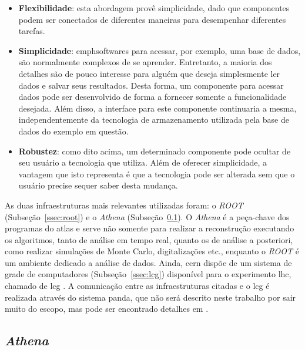 \begin{itemize}
\item \textbf{Flexibilidade}: esta abordagem provê simplicidade, dado que componentes podem
ser conectados de diferentes maneiras para desempenhar diferentes tarefas.
\item \textbf{Simplicidade}: emph{softwares} para acessar, por exemplo, uma base de dados, são
normalmente complexos de se aprender. Entretanto, a maioria dos detalhes são de
pouco interesse para alguém que deseja simplesmente ler dados e salvar seus
resultados. Desta forma, um componente para acessar dados pode ser desenvolvido
de forma a fornecer somente a funcionalidade desejada. Além disso, a interface
para este componente continuaria a mesma, independentemente da tecnologia de
armazenamento utilizada pela base de dados do exemplo em questão.
\item \textbf{Robustez}: como dito acima, um determinado componente pode ocultar de seu
usuário a tecnologia que utiliza. Além de oferecer simplicidade, a vantagem que
isto representa é que a tecnologia pode ser alterada sem que o usuário precise
sequer saber desta mudança.
\end{itemize}



As duas infraestruturas mais relevantes utilizadas foram: o \emph{ROOT}
(Subseção~\ref{ssec:root}) e o \emph{Athena} (Subseção~\ref{ssec:athena}). 
O \emph{Athena} é a peça-chave dos programas do \gls{atlas} e serve não somente
para realizar a reconstrução executando os algoritmos, tanto de análise em tempo
real, quanto os de análise a posteriori, como realizar simulações de Monte Carlo, digitalizações etc., 
enquanto o \emph{ROOT} é um ambiente dedicado a análise de dados. 
Ainda, \gls{cern} dispõe de um sistema de grade de 
computadores (Subseção~\ref{ssec:lcg}) disponível para o experimento \gls{lhc}, chamado de \gls{lcg} 
\cite{grid}. A comunicação entre as infraestruturas citadas e o \gls{lcg} é realizada através do sistema
\gls{panda}, que não será descrito neste trabalho por sair muito do escopo, 
mas pode ser encontrado detalhes em \cite{panda}.

\subsection{\emph{Athena}}
\label{ssec:athena}


